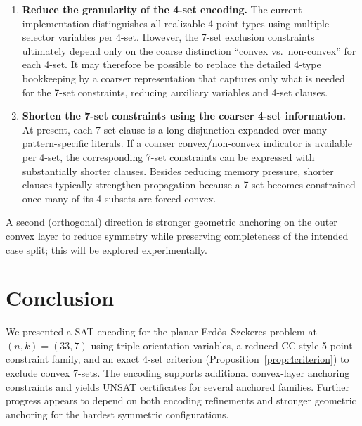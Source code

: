 \documentclass[11pt,a4paper]{article}
\theoremstyle{definition}
\begin{document}
\begin{enumerate}
\item \textbf{Reduce the granularity of the 4-set encoding.}
The current implementation distinguishes all realizable 4-point types using multiple selector variables per 4-set. However, the 7-set exclusion constraints ultimately depend only on the coarse distinction ``convex vs.\ non-convex'' for each 4-set. It may therefore be possible to replace the detailed 4-type bookkeeping by a coarser representation that captures only what is needed for the 7-set constraints, reducing auxiliary variables and 4-set clauses.

\item \textbf{Shorten the 7-set constraints using the coarser 4-set information.}
At present, each 7-set clause is a long disjunction expanded over many pattern-specific literals. If a coarser convex/non-convex indicator is available per 4-set, the corresponding 7-set constraints can be expressed with substantially shorter clauses. Besides reducing memory pressure, shorter clauses typically strengthen propagation because a 7-set becomes constrained once many of its 4-subsets are forced convex.
\end{enumerate}

A second (orthogonal) direction is stronger geometric anchoring on the outer convex layer to reduce symmetry while preserving completeness of the intended case split; this will be explored experimentally.

\section{Conclusion}

We presented a SAT encoding for the planar Erd\H{o}s--Szekeres problem at $(n,k)=(33,7)$ using triple-orientation variables, a reduced CC-style 5-point constraint family, and an exact 4-set criterion (Proposition~\ref{prop:4criterion}) to exclude convex 7-sets. The encoding supports additional convex-layer anchoring constraints and yields UNSAT certificates for several anchored families. Further progress appears to depend on both encoding refinements and stronger geometric anchoring for the hardest symmetric configurations.
\end{document}

